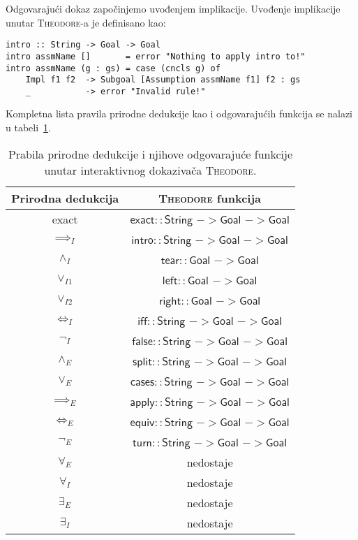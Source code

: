 \documentclass[a4paper,10pt]{article}
\theoremstyle{definition}
\begin{document}
Odgovarajući dokaz započinjemo uvođenjem implikacije. Uvođenje implikacije unutar \textsc{Theodore}-a je definisano kao:
\begin{lstlisting}
intro :: String -> Goal -> Goal
intro assmName []       = error "Nothing to apply intro to!"
intro assmName (g : gs) = case (cncls g) of
    Impl f1 f2  -> Subgoal [Assumption assmName f1] f2 : gs
    _           -> error "Invalid rule!"
\end{lstlisting}
Kompletna lista pravila prirodne dedukcije kao i odgovarajućih funkcija se nalazi u tabeli~\ref{tab:natded}.

\begin{table}[h!]
    \centering
    \begin{tabular}{c | c}
        Prirodna dedukcija & \textsc{Theodore} funkcija \\
        \hline
        exact & $\mathsf{exact :: String}$ $-> \mathsf{Goal}$ $-> \mathsf{Goal}$ \\
        $\implies_I$ & $\mathsf{intro :: String}$ $-> \mathsf{Goal}$ $-> \mathsf{Goal}$ \\
        $\land_I$ & $\mathsf{tear :: Goal}$ $-> \mathsf{Goal}$ \\
        $\lor_{I1}$ & $\mathsf{left :: Goal}$ $-> \mathsf{Goal}$ \\
        $\lor_{I2}$ & $\mathsf{right :: Goal}$ $-> \mathsf{Goal}$ \\
        $\iff_I$ & $\mathsf{iff :: String}$ $-> \mathsf{Goal}$ $-> \mathsf{Goal}$ \\
        $\neg_I$ & $\mathsf{false :: String}$ $-> \mathsf{Goal}$ $-> \mathsf{Goal}$ \\
        $\land_E$ & $\mathsf{split :: String}$ $-> \mathsf{Goal}$ $-> \mathsf{Goal}$ \\
        $\lor_E$ & $\mathsf{cases :: String}$ $-> \mathsf{Goal}$ $-> \mathsf{Goal}$ \\
        $\implies_E$ & $\mathsf{apply :: String}$ $-> \mathsf{Goal}$ $-> \mathsf{Goal}$ \\
        $\iff_E$ & $\mathsf{equiv :: String}$ $-> \mathsf{Goal}$ $-> \mathsf{Goal}$ \\
        $\neg_E$ & $\mathsf{turn :: String}$ $-> \mathsf{Goal}$ $-> \mathsf{Goal}$ \\
        $\forall_E$ & nedostaje \\
        $\forall_I$ & nedostaje \\
        $\exists_E$ & nedostaje \\
        $\exists_I$ & nedostaje \\
    \end{tabular}
    \caption{Prabila prirodne dedukcije i njihove odgovarajuće funkcije unutar interaktivnog dokazivača \textsc{Theodore}.}
    \label{tab:natded}
\end{table}
\end{document}
